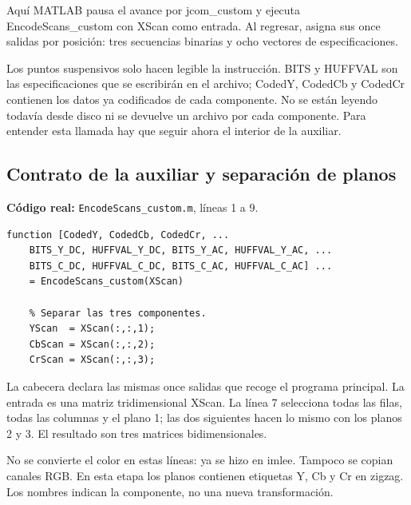 \documentclass[11pt,a4paper,oneside]{report}
\begin{document}
Aquí MATLAB pausa el avance por jcom\_custom y ejecuta EncodeScans\_custom
con XScan como entrada. Al regresar, asigna sus once salidas por posición:
tres secuencias binarias y ocho vectores de especificaciones.

Los puntos suspensivos solo hacen legible la instrucción. BITS y HUFFVAL
son las especificaciones que se escribirán en el archivo; CodedY, CodedCb
y CodedCr contienen los datos ya codificados de cada componente. No se están
leyendo todavía desde disco ni se devuelve un archivo por cada componente.
Para entender esta llamada hay que seguir ahora el interior de la auxiliar.


\par\medskip\noindent\begin{minipage}{\linewidth}

\subsection{Contrato de la auxiliar y separación de planos}

\textbf{Código real:} \texttt{EncodeScans\_custom.m}, líneas 1 a 9.

\begin{lstlisting}[firstnumber=1]
function [CodedY, CodedCb, CodedCr, ...
    BITS_Y_DC, HUFFVAL_Y_DC, BITS_Y_AC, HUFFVAL_Y_AC, ...
    BITS_C_DC, HUFFVAL_C_DC, BITS_C_AC, HUFFVAL_C_AC] ...
    = EncodeScans_custom(XScan)

    % Separar las tres componentes.
    YScan  = XScan(:,:,1);
    CbScan = XScan(:,:,2);
    CrScan = XScan(:,:,3);
\end{lstlisting}

\end{minipage}\par


La cabecera declara las mismas once salidas que recoge el programa principal.
La entrada es una matriz tridimensional XScan. La línea 7 selecciona todas
las filas, todas las columnas y el plano 1; las dos siguientes hacen lo mismo
con los planos 2 y 3. El resultado son tres matrices bidimensionales.

No se convierte el color en estas líneas: ya se hizo en imlee. Tampoco se
copian canales RGB. En esta etapa los planos contienen etiquetas Y, Cb y Cr
en zigzag. Los nombres indican la componente, no una nueva transformación.
\end{document}
